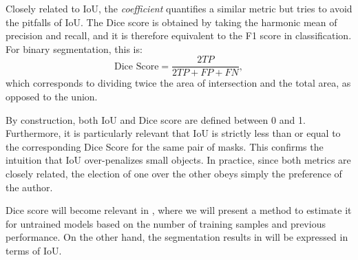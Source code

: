 Closely related to IoU, the \textit{ coefficient} quantifies a similar metric but tries to avoid the pitfalls of IoU. The Dice score is obtained by taking the harmonic mean of precision and recall, and it is therefore equivalent to the F1 score in classification. For binary segmentation, this is:
\begin{equation*}
    \text{Dice Score} = \dfrac{2TP}{2TP + FP + FN},
    \label{eq:dice}
\end{equation*}
which corresponds to dividing twice the area of intersection and the total area, as opposed to the union.

By construction, both IoU and Dice score are defined between 0 and 1. Furthermore, it is particularly relevant that IoU is strictly less than or equal to the corresponding Dice Score for the same pair of masks. This confirms the intuition that IoU over-penalizes small objects. In practice, since both metrics are closely related, the election of one over the other obeys simply the preference of the author. 

Dice score will become relevant in , where we will present a method to estimate it for untrained models based on the number of training samples and previous performance. On the other hand, the segmentation results in  will be expressed in terms of IoU.
